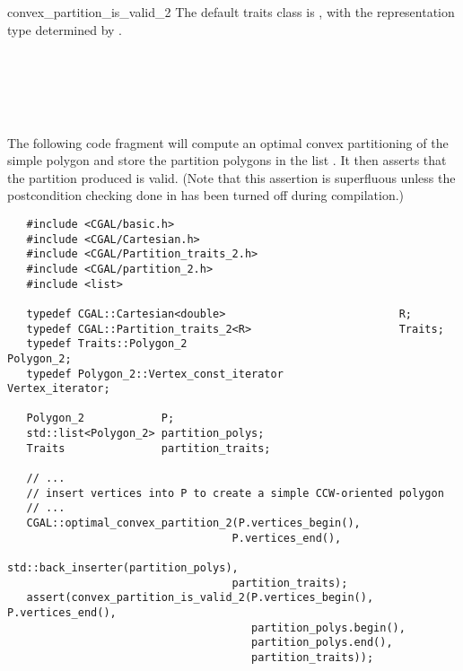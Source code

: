 \begin{ccRefFunction}{convex_partition_is_valid_2}
The default traits class  is ,%
with the representation type determined by .

\ccSeeAlso

 \\
 \\
\\
 \\

\ccExample

The following code fragment will compute an optimal
convex partitioning of the simple polygon  
and store the partition polygons in the list .
It then asserts that the partition produced is valid. 
(Note that this assertion is superfluous unless the postcondition checking
done in  has been turned off during
compilation.)

\begin{verbatim}
   #include <CGAL/basic.h>
   #include <CGAL/Cartesian.h>
   #include <CGAL/Partition_traits_2.h>
   #include <CGAL/partition_2.h>
   #include <list>

   typedef CGAL::Cartesian<double>                           R;
   typedef CGAL::Partition_traits_2<R>                       Traits;
   typedef Traits::Polygon_2                                 Polygon_2;
   typedef Polygon_2::Vertex_const_iterator                  Vertex_iterator;

   Polygon_2            P;
   std::list<Polygon_2> partition_polys;
   Traits               partition_traits;

   // ...
   // insert vertices into P to create a simple CCW-oriented polygon
   // ...
   CGAL::optimal_convex_partition_2(P.vertices_begin(),
                                   P.vertices_end(),
                                   std::back_inserter(partition_polys),
                                   partition_traits);
   assert(convex_partition_is_valid_2(P.vertices_begin(), P.vertices_end(),
                                      partition_polys.begin(), 
                                      partition_polys.end(),
                                      partition_traits));
\end{verbatim}

\end{ccRefFunction}
\renewcommand\ccRefPageBegin{\ccParDims\cgalColumnLayout}
\renewcommand\ccRefPageEnd{\ccParDims\cgalColumnLayout}
